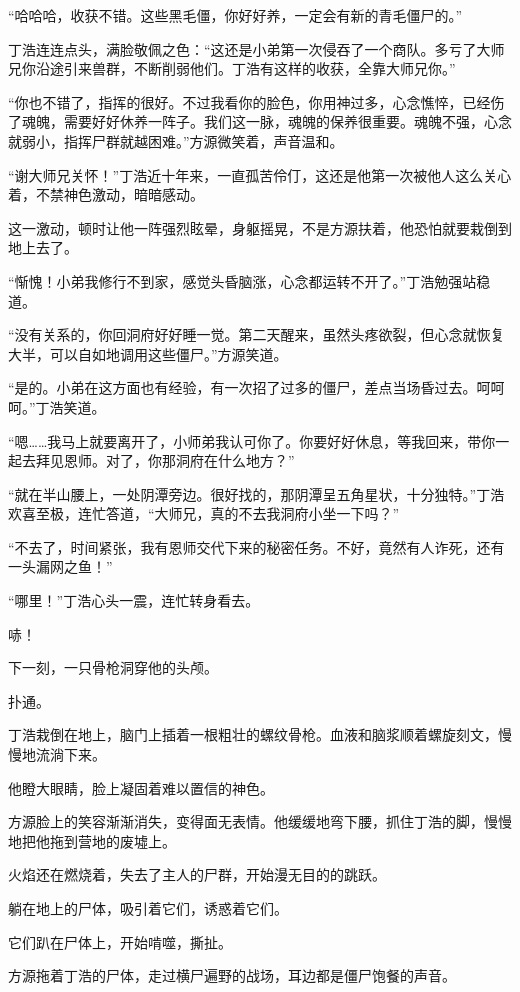 \begin{this_body}
“哈哈哈，收获不错。这些黑毛僵，你好好养，一定会有新的青毛僵尸的。”

丁浩连连点头，满脸敬佩之色：“这还是小弟第一次侵吞了一个商队。多亏了大师兄你沿途引来兽群，不断削弱他们。丁浩有这样的收获，全靠大师兄你。”

“你也不错了，指挥的很好。不过我看你的脸色，你用神过多，心念憔悴，已经伤了魂魄，需要好好休养一阵子。我们这一脉，魂魄的保养很重要。魂魄不强，心念就弱小，指挥尸群就越困难。”方源微笑着，声音温和。

“谢大师兄关怀！”丁浩近十年来，一直孤苦伶仃，这还是他第一次被他人这么关心着，不禁神色激动，暗暗感动。

这一激动，顿时让他一阵强烈眩晕，身躯摇晃，不是方源扶着，他恐怕就要栽倒到地上去了。

“惭愧！小弟我修行不到家，感觉头昏脑涨，心念都运转不开了。”丁浩勉强站稳道。

“没有关系的，你回洞府好好睡一觉。第二天醒来，虽然头疼欲裂，但心念就恢复大半，可以自如地调用这些僵尸。”方源笑道。

“是的。小弟在这方面也有经验，有一次招了过多的僵尸，差点当场昏过去。呵呵呵。”丁浩笑道。

“嗯……我马上就要离开了，小师弟我认可你了。你要好好休息，等我回来，带你一起去拜见恩师。对了，你那洞府在什么地方？”

“就在半山腰上，一处阴潭旁边。很好找的，那阴潭呈五角星状，十分独特。”丁浩欢喜至极，连忙答道，“大师兄，真的不去我洞府小坐一下吗？”

“不去了，时间紧张，我有恩师交代下来的秘密任务。不好，竟然有人诈死，还有一头漏网之鱼！”

“哪里！”丁浩心头一震，连忙转身看去。

哧！

下一刻，一只骨枪洞穿他的头颅。

扑通。

丁浩栽倒在地上，脑门上插着一根粗壮的螺纹骨枪。血液和脑浆顺着螺旋刻文，慢慢地流淌下来。

他瞪大眼睛，脸上凝固着难以置信的神色。

方源脸上的笑容渐渐消失，变得面无表情。他缓缓地弯下腰，抓住丁浩的脚，慢慢地把他拖到营地的废墟上。

火焰还在燃烧着，失去了主人的尸群，开始漫无目的的跳跃。

躺在地上的尸体，吸引着它们，诱惑着它们。

它们趴在尸体上，开始啃噬，撕扯。

方源拖着丁浩的尸体，走过横尸遍野的战场，耳边都是僵尸饱餐的声音。


\end{this_body}
